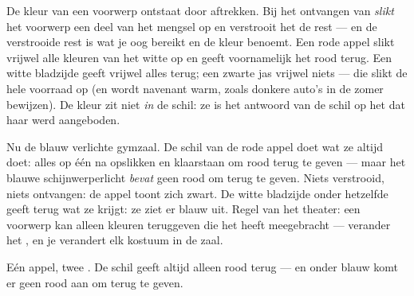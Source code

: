 \begin{proposition}\label{prop:g8:colors-spectra:objectcolor}
De kleur van een  voorwerp ontstaat door aftrekken.
Bij het ontvangen van  \emph{slikt} het voorwerp een deel
van het mengsel op en verstrooit het de rest --- en de verstrooide rest
is wat je oog bereikt en de kleur benoemt. Een rode appel slikt vrijwel
alle kleuren van het witte  op en geeft voornamelijk het
rood terug. Een witte bladzijde geeft vrijwel alles terug; een zwarte
jas vrijwel niets --- die slikt de hele voorraad op (en wordt navenant
warm, zoals donkere auto's in de zomer bewijzen). De kleur zit niet
\emph{in} de schil: ze is het antwoord van de schil op het
 dat haar werd aangeboden.
\end{proposition}

\begin{example}[De gymzaalproef]\label{ex:g8:colors-spectra:gym}
Nu de blauw verlichte gymzaal. De schil van de rode appel doet wat ze
altijd doet: alles op één na opslikken en klaarstaan om rood terug te
geven --- maar het blauwe schijnwerperlicht \emph{bevat} geen rood om
terug te geven. Niets verstrooid, niets ontvangen: de appel toont zich
zwart. De witte bladzijde onder hetzelfde  geeft terug wat ze
krijgt: ze ziet er blauw uit. Regel van het theater: een voorwerp kan
alleen kleuren teruggeven die het  heeft meegebracht ---
verander het , en je verandert elk kostuum in de zaal.
\end{example}

\begin{omfigure}

{\small Eén appel, twee . De schil geeft altijd alleen rood
terug --- en onder blauw  komt er geen rood aan om terug te
geven.}
\end{omfigure}

